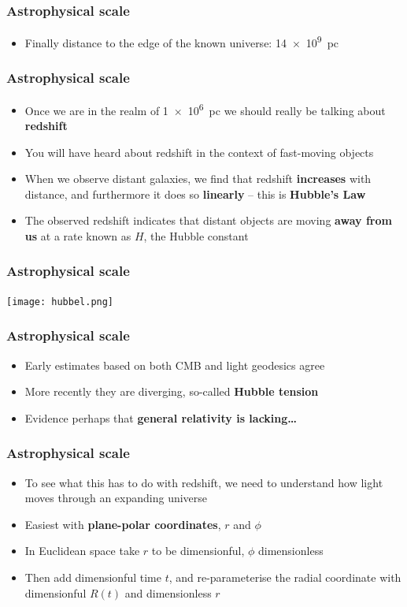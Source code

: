 \documentclass{beamer}
\begin{document}
\begin{frame}
  \frametitle{Astrophysical scale}
  \begin{itemize}
    \item Finally distance to the edge of the known universe: \SI{14e9}{pc}
  \end{itemize}
\end{frame}

\begin{frame}
  \frametitle{Astrophysical scale}
  \begin{itemize}
    \item Once we are in the realm of \SI{1e6}{pc} we should really be talking about \textbf{redshift}
    \item You will have heard about redshift in the context of fast-moving objects
    \item When we observe distant galaxies, we find that redshift \textbf{increases} with distance, and furthermore it does so \textbf{linearly} -- this is \textbf{Hubble's Law}
    \item The observed redshift indicates that distant objects are moving \textbf{away from us} at a rate known as $H$, the Hubble constant
  \end{itemize}
\end{frame}

\begin{frame}
  \frametitle{Astrophysical scale}
  \center
  \texttt{[image: hubbel.png]}
\end{frame}

\begin{frame}
  \frametitle{Astrophysical scale}
  \begin{itemize}
    \item Early estimates based on both CMB and light geodesics agree
    \item More recently they are diverging, so-called \textbf{Hubble tension}
    \item Evidence perhaps that \textbf{general relativity is lacking\ldots}
  \end{itemize}
\end{frame}

\begin{frame}
  \frametitle{Astrophysical scale}
  \begin{itemize}
    \item To see what this has to do with redshift, we need to understand how light moves through an expanding universe
    \item Easiest with \textbf{plane-polar coordinates}, $r$ and $\phi$
    \item In Euclidean space take $r$ to be dimensionful, $\phi$ dimensionless
    \item Then add dimensionful time $t$, and re-parameterise the radial coordinate with dimensionful $R(t)$ and dimensionless $r$
  \end{itemize}
\end{frame}
\end{document}
